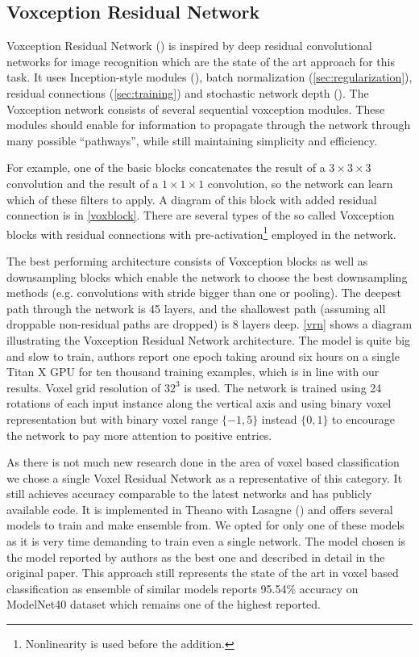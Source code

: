 \subsection{Voxception Residual Network}
Voxception Residual Network (\cite{brock_generative_2016}) is inspired by deep residual convolutional networks for image recognition which are the state of the art approach for this task. It uses Inception-style modules (\cite{szegedy_inception-v4_2016}), batch normalization (\autoref{sec:regularization}), residual connections (\autoref{sec:training}) and stochastic network depth (\cite{huang_deep_2016}). The Voxception network consists of several sequential voxception modules. These modules  should enable for information to propagate through the network through many possible “pathways”, while still maintaining simplicity and efficiency. \par
For example, one of the basic blocks concatenates the result of a $3\times3\times3$ convolution and the result of a $1\times1\times1$ convolution, so the network can learn which of these filters to apply. A diagram of this block with added residual connection is in \autoref{voxblock}. There are several types of the so called Voxception blocks with residual connections with pre-activation\footnote{Nonlinearity is used before the addition.} employed in the network. \par
The best performing architecture consists of Voxception blocks as well as downsampling blocks which enable the network to choose the best downsampling methods (e.g. convolutions with stride bigger than one or pooling). The deepest path through the network is 45 layers, and the shallowest path (assuming all droppable non-residual paths are dropped) is 8 layers deep. \autoref{vrn} shows a diagram illustrating the Voxception Residual Network architecture.
The model is quite big and slow to train, authors report one epoch taking around six hours on a single Titan X GPU for ten thousand training examples, which is in line with our results. 
Voxel grid resolution of $32^3$ is used. The network is trained using 24 rotations of each input instance along the vertical axis and using binary voxel representation but with binary voxel range $\{-1,5\}$ instead $\{0,1\}$  to encourage the network to pay more attention to positive entries. \par
As there is not much new research done in the area of voxel based classification we chose a single Voxel Residual Network as a representative of this category. It still achieves accuracy comparable to the latest networks and has publicly available code. It is implemented in Theano with Lasagne (\cite{brock_vrn_2016}) and offers several models to train and make ensemble from. We opted for only one of these models as it is very time demanding to train even a single network. The model chosen is the model reported by authors as the best one and described in detail in the original paper. 
This approach still represents the state of the art in voxel based classification as ensemble of similar models reports 95.54\% accuracy on ModelNet40 dataset which remains one of the highest reported.


